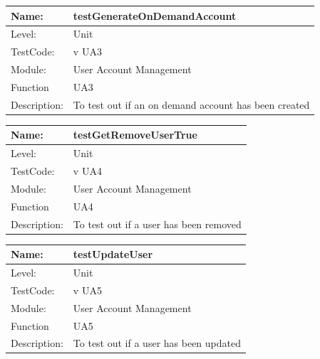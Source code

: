 \documentclass[12pt]{article}
\begin{document}
\begin{center}
\begin{tabular}{|l|p{12cm}|}
\hline

 Name: & testGenerateOnDemandAccount \\
\hline
Level: & Unit \\
\hline
TestCode: & v UA3 \\
\hline
Module:& User Account Management\\
\hline
Function & UA3 \\
\hline
Description: & To test out if an on demand account has been created \\
\hline

\end{tabular}
\end{center}

\begin{center}
\begin{tabular}{|l|p{12cm}|}
\hline

 Name: & testGetRemoveUserTrue \\
\hline
Level: & Unit \\
\hline
TestCode: & v UA4 \\
\hline
Module:& User Account Management\\
\hline
Function & UA4 \\
\hline
Description: & To test out if a user has been removed \\
\hline

\end{tabular}
\end{center}

\begin{center}
\begin{tabular}{|l|p{12cm}|}
\hline

 Name: & testUpdateUser \\
\hline
Level: & Unit \\
\hline
TestCode: & v UA5 \\
\hline
Module:& User Account Management\\
\hline
Function & UA5 \\
\hline
Description: & To test out if a user has been updated \\
\hline

\end{tabular}
\end{center}
\end{document}
